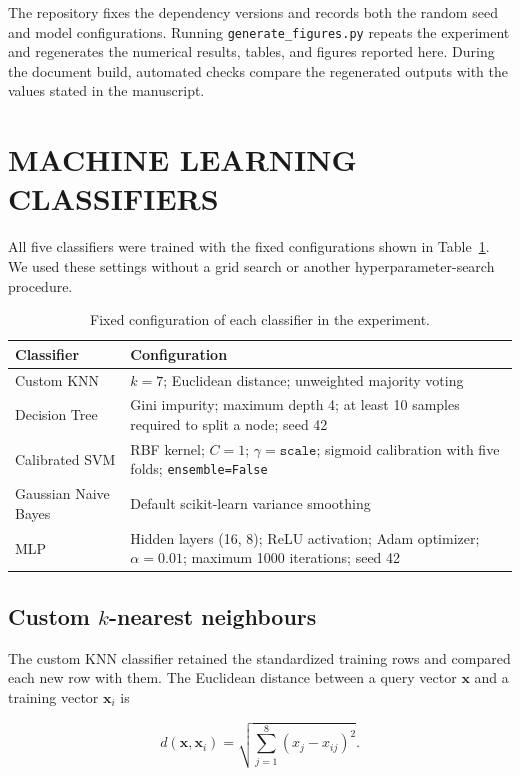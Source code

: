 \documentclass[pdflatex,sn-vancouver-num]{sn-jnl}
\begin{document}
The repository fixes the dependency versions and records both the random seed and model configurations. Running \texttt{generate\_figures.py} repeats the experiment and regenerates the numerical results, tables, and figures reported here. During the document build, automated checks compare the regenerated outputs with the values stated in the manuscript.

\section{MACHINE LEARNING CLASSIFIERS}\label{sec:models}

All five classifiers were trained with the fixed configurations shown in Table~\ref{tab:settings}. We used these settings without a grid search or another hyperparameter-search procedure.

\begin{table}[!htbp]
\caption{Fixed configuration of each classifier in the experiment.}\label{tab:settings}
\centering
\begin{tabular}{@{}p{}p{}@{}}
\toprule
Classifier & Configuration \\
\midrule
Custom KNN & $k=7$; Euclidean distance; unweighted majority voting \\
Decision Tree & Gini impurity; maximum depth 4; at least 10 samples required to split a node; seed 42 \\
Calibrated SVM & RBF kernel; $C=1$; $\gamma=\texttt{scale}$; sigmoid calibration with five folds; \texttt{ensemble=False} \\
Gaussian Naive Bayes & Default scikit-learn variance smoothing \\
MLP & Hidden layers (16, 8); ReLU activation; Adam optimizer; $\alpha=0.01$; maximum 1000 iterations; seed 42 \\
\bottomrule
\end{tabular}
\end{table}

\subsection{Custom \texorpdfstring{$k$}{k}-nearest neighbours}\label{subsec:knn}

The custom KNN classifier retained the standardized training rows and compared each new row with them. The Euclidean distance between a query vector $\mathbf{x}$ and a training vector $\mathbf{x}_i$ is

\begin{equation}
d(\mathbf{x},\mathbf{x}_i)=\sqrt{\sum_{j=1}^{8}(x_j-x_{ij})^2}.
\label{eq:distance}
\end{equation}
\end{document}
